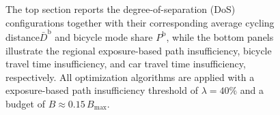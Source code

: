 \documentclass[lettersize,journal]{IEEEtran}
\begin{document}
\begin{figure}[!h]
  
  \caption{\footnotesize The top section reports the degree-of-separation (DoS) configurations together with their corresponding average cycling distance$\bar{D}^\mathrm{b}$ and bicycle mode share $P^\mathrm{b}$, while the bottom panels illustrate the regional exposure-based path insufficiency, bicycle travel time insufficiency, and car travel time insufficiency, respectively.  All optimization algorithms are applied with a exposure-based path insufficiency threshold of $\lambda = \mathrm{40 \%}$ and a budget of $B \approx 0.15\,B_{\max}$.
}
  \label{grenoble_dos}
\end{figure}

\end{document}
